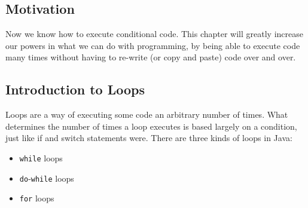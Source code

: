 
\subsection{Motivation}
Now we know how to execute conditional code. This chapter will greatly increase our powers in what we can do with programming, by being able to execute code many times without having to re-write (or copy and paste) code over and over.

\subsection{Introduction to Loops}
Loops are a way of executing some code an arbitrary number of times. What determines the number of times a loop executes is based largely on a condition, just like if and switch statements were. There are three kinds of loops in Java:
\begin{itemize}
\item \verb|while| loops
\item \verb|do|-\verb|while| loops
\item \verb|for| loops
\end{itemize}

